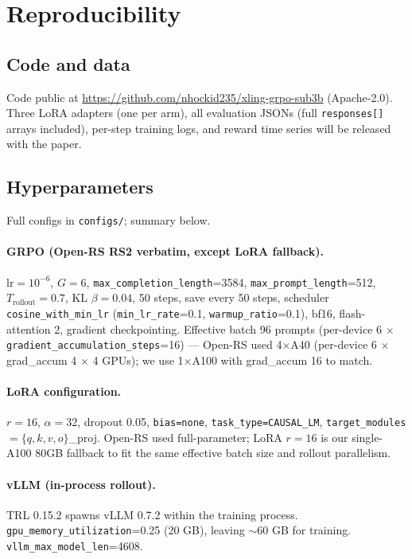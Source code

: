 
\section{Reproducibility}
\label{sec:reproducibility}

\subsection{Code and data}
Code public at \url{https://github.com/nhockid235/xling-grpo-sub3b} (Apache-2.0).
Three LoRA adapters (one per arm), all evaluation JSONs (full \texttt{responses[]}
arrays included), per-step training logs, and reward time series will be released
with the paper.

\subsection{Hyperparameters}
Full configs in \texttt{configs/}; summary below.

\paragraph{GRPO (Open-RS RS2 verbatim, except LoRA fallback).}
$\text{lr}=10^{-6}$, $G{=}6$, \texttt{max\_completion\_length}=3584,
\texttt{max\_prompt\_length}=512, $T_{\text{rollout}}=0.7$, KL $\beta{=}0.04$, 50 steps,
save every 50 steps, scheduler \texttt{cosine\_with\_min\_lr}
(\texttt{min\_lr\_rate}=0.1, \texttt{warmup\_ratio}=0.1), bf16, flash-attention 2,
gradient checkpointing. Effective batch 96 prompts (per-device 6 $\times$
\texttt{gradient\_accumulation\_steps}=16) --- Open-RS used 4$\times$A40 (per-device 6
$\times$ grad\_accum 4 $\times$ 4 GPUs); we use 1$\times$A100 with grad\_accum 16
to match.

\paragraph{LoRA configuration.} $r{=}16$, $\alpha{=}32$, dropout 0.05,
\texttt{bias=none}, \texttt{task\_type=CAUSAL\_LM}, \texttt{target\_modules}
$=\{q, k, v, o\}$\_proj. Open-RS used full-parameter; LoRA $r{=}16$ is our
single-A100 80GB fallback to fit the same effective batch size and rollout
parallelism.

\paragraph{vLLM (in-process rollout).} TRL 0.15.2 spawns vLLM 0.7.2 within the
training process. \texttt{gpu\_memory\_utilization}=0.25 (20 GB), leaving
$\sim$60 GB for training. \texttt{vllm\_max\_model\_len}=4608.

